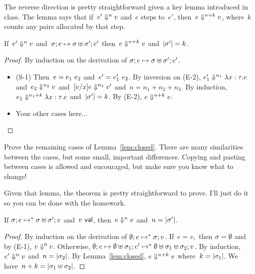 \documentclass{article}
\begin{document}
The reverse direction is pretty straightforward given a key lemma introduced
in class.
%
The lemma says that if~$\eval[n]{e'}{v}$ and~$e$ steps to~$e'$,
then~$\eval[n+k]{e}{v}$, where~$k$ counts any pairs allocated by that step.

\begin{lemma}\label{lem:closed}
  If~$\eval[n]{e'}{v}$
  and~$\cfg{\store}{e} \step \cfg{\stjoin{\store}{\store'}}{e'}$
  then~$\eval[n+k]{e}{v}$
  and~$|\store'| = k$.
\end{lemma}
  \begin{proof}
    By induction on the derivation of 
    $\cfg{\store}{e} \step \cfg{\stjoin{\store}{\store'}}{e'}$.
    \begin{itemize}
    \item (S-1)
      Then~$e = \kwapp{e_1}{e_2}$ and~$e' = \kwapp{e_1'}{e_2}$.
      By inversion on (E-2),
      $\eval[n_1]{e_1'}{\kwfun{x}{\tau}{e}}$
      and~$\eval[n_2]{e_2}{v}$
      and~$\eval[n_3]{\sub{v}{x}{e}}{v'}$
      and~$n = n_1 + n_2 + n_3$.
      By induction,
      $\eval[n_1 + k]{e_1}{\kwfun{x}{\tau}{e}}$
      and~$|\store'| = k$.
      By (E-2),
      $\eval[n+k]{e}{v}$.

    \item Your other cases here...
    \end{itemize}
  \end{proof}

\begin{task}
  Prove the remaining cases of Lemma~\ref{lem:closed}.
  There are many similarities between the cases, but some small, important
  differences. Copying and pasting between cases is allowed and encouraged,
  but make sure you know what to change!
\end{task}

Given that lemma, the theorem is pretty straightforward to prove.
%
I'll just do it so you can be done with the homework.

\begin{thm}
  If $\cfg{\store}{e} \step^* \cfg{\stjoin{\store}{\store'}}{v}$ and~$v \val$,
  then~$\eval[n]{e}{v}$ and~$n = |\store'|$.
\end{thm}
\begin{proof}
  By induction on the derivation of $\cfg{\estore}{e} \step^* \cfg{\store}{v}$.
  If~$e = v,$ then $\store = \estore$ and by (E-1), $\eval[0]{v}{v}$. 
  Otherwise,
  $\cfg{\estore}{e} \step \cfg{\stjoin{\estore}{\store_1}}{e'}
  \step^* \cfg{\stjoin{\estore}{\stjoin{\store_1}{\store_2}}}{v}$.
  By induction,~$\eval[n]{e'}{v}$
  and~$n = |\store_2|$.
  By Lemma~\ref{lem:closed}, $\eval[n + k]{e}{v}$
  where~$k = |\store_1|$.
  We have~$n + k = |\stjoin{\store_1}{\store_2}|$.
\end{proof}
  

  
\end{document}
